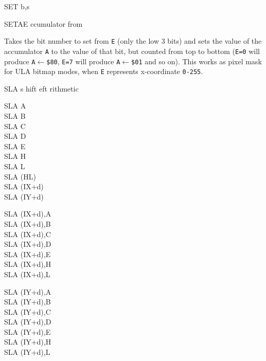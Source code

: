 \begin{basedescript}{
	\desclabelstyle{\multilinelabel}
	\desclabelwidth{3cm}}
\begin{DetailItem}{SET b,s}
	\end{DetailItem}

	\begin{DetailItem}{SETAE\ZXN}
		{ ccumulator from }
		{\SymSETAE}

		Takes the bit number to set from {\tt E} (only the low 3 bits) and sets the value of the accumulator {\tt A} to the value of that bit, but counted from top to bottom ({\tt E=0} will produce {\tt A$\leftarrow$\$80}, {\tt E=7} will produce {\tt A$\leftarrow$\$01} and so on). This works as pixel mask for ULA bitmap modes, when {\tt E} represents x-coordinate {\tt 0-255}.

		\begin{DetailEffects}
			\FlagsSETAE
		\end{DetailEffects}
						
		\begin{DetailTiming}
		\end{DetailTiming}

	\end{DetailItem}

	\pagebreak
	\begin{DetailItem}{SLA s}
		{hift eft rithmetic}
		{}
		
		\begin{DetailVariants}
			SLA A\\
			SLA B\\
			SLA C\\
			SLA D\\
			SLA E\\
			SLA H\\
			SLA L\\
			SLA (HL)\\
			SLA (IX+d)\\
			SLA (IY+d)

			\columnbreak
			SLA (IX+d),A\UNDOC\\
			SLA (IX+d),B\UNDOC\\
			SLA (IX+d),C\UNDOC\\
			SLA (IX+d),D\UNDOC\\
			SLA (IX+d),E\UNDOC\\
			SLA (IX+d),H\UNDOC\\
			SLA (IX+d),L\UNDOC

			\columnbreak
			SLA (IY+d),A\UNDOC\\
			SLA (IY+d),B\UNDOC\\
			SLA (IY+d),C\UNDOC\\
			SLA (IY+d),D\UNDOC\\
			SLA (IY+d),E\UNDOC\\
			SLA (IY+d),H\UNDOC\\
			SLA (IY+d),L\UNDOC
		\end{DetailVariants}


\end{DetailItem}
\end{basedescript}
